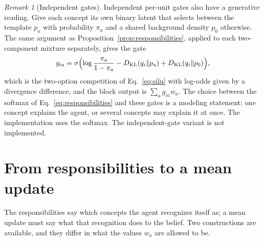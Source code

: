 \documentclass[11pt]{article}
\theoremstyle{definition}
\theoremstyle{remark}
\newtheorem{remark}{Remark}
\newcommand{\KL}{D_{\mathrm{KL}}}
\begin{document}
\begin{remark}[Independent gates]
\label{rem:independent}
Independent per-unit gates also have a generative reading. Give each concept its own binary latent that selects between the template $p_a$ with probability $\pi_a$ and a shared background density $p_0$ otherwise. The same argument as Proposition~\ref{prop:responsibilities}, applied to each two-component mixture separately, gives the gate
\begin{equation}
g_{ia}=\sigma\Bigl(\log\frac{\pi_a}{1-\pi_a}-\KL(q_i\|p_a)+\KL(q_i\|p_0)\Bigr),
\end{equation}
which is the two-option competition of Eq.~\eqref{eq:silu} with log-odds given by a divergence difference, and the block output is $\sum_ag_{ia}w_a$. The choice between the softmax of Eq.~\eqref{eq:responsibilities} and these gates is a modeling statement: one concept explains the agent, or several concepts may explain it at once. The implementation uses the softmax. The independent-gate variant is not implemented.
\end{remark}

\section{From responsibilities to a mean update}
\label{sec:update}

The responsibilities say which concepts the agent recognizes itself as; a mean update must say what that recognition does to the belief. Two constructions are available, and they differ in what the values $w_a$ are allowed to be.
\end{document}

